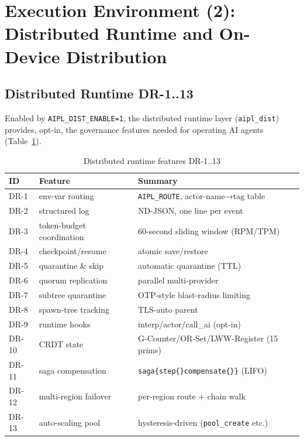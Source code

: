 \documentclass[11pt,a4paper]{article}
\newcommand{\code}[1]{\texttt{\small #1}}
\begin{document}
\section{Execution Environment (2): Distributed Runtime and On-Device Distribution}\label{sec:dist}

\subsection{Distributed Runtime DR-1..13}
Enabled by \code{AIPL\_DIST\_ENABLE=1}, the distributed runtime layer
(\code{aipl\_dist}) provides, opt-in, the governance features needed for
operating AI agents (Table~\ref{tab:dr}).

\begin{table}[h]
\centering\small
\caption{Distributed runtime features DR-1..13}\label{tab:dr}
\begin{tabularx}{\linewidth}{@{}l l X@{}}
\toprule
ID & Feature & Summary \\
\midrule
DR-1 & env-var routing & \code{AIPL\_ROUTE}, actor-name→tag table \\
DR-2 & structured log & ND-JSON, one line per event \\
DR-3 & token-budget coordination & 60-second sliding window (RPM/TPM) \\
DR-4 & checkpoint/resume & atomic save/restore \\
DR-5 & quarantine \& skip & automatic quarantine (TTL) \\
DR-6 & quorum replication & parallel multi-provider \\
DR-7 & subtree quarantine & OTP-style blast-radius limiting \\
DR-8 & spawn-tree tracking & TLS-auto parent \\
DR-9 & runtime hooks & interp/actor/call\_ai (opt-in) \\
DR-10 & CRDT state & G-Counter/OR-Set/LWW-Register (15 prims) \\
DR-11 & saga compensation & \code{saga\{step\{\}compensate\{\}\}} (LIFO) \\
DR-12 & multi-region failover & per-region route + chain walk \\
DR-13 & auto-scaling pool & hysteresis-driven (\code{pool\_create} etc.) \\
\bottomrule
\end{tabularx}
\end{table}
\end{document}
